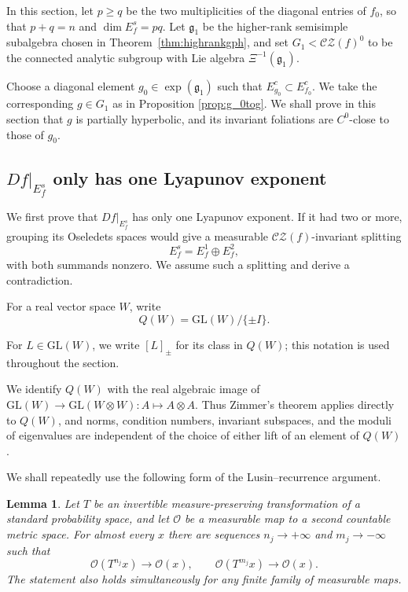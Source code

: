 \documentclass[11pt]{amsart}
\numberwithin{equation}{section}
\newcommand{\CZ}{\mathcal{CZ}}
\newcommand{\GL}{\mathrm{GL}}
\theoremstyle{plain}
\newtheorem{lem}[thm]{Lemma}
\begin{document}
In this section, let $p\ge q$ be the two multiplicities of the diagonal entries of $f_0$,
so that $p+q=n$ and $\dim E_f^s=pq$.  Let $\mathfrak g_1$ be the
higher-rank semisimple subalgebra chosen in
Theorem~\ref{thm:highrankgph}, and set
$
G_1<\CZ(f)^0$ to be the connected analytic subgroup with
Lie algebra $\Xi^{-1}(\mathfrak g_1).$

Choose a diagonal element $g_0\in\exp(\mathfrak g_1)$ such that $E^c_{g_0}\subset E^c_{f_0}$.  We take the corresponding $g\in G_1$ as in Proposition \ref{prop:g_0tog}. We shall prove in this section that $g$ is
partially hyperbolic, and its invariant foliations are $C^0$-close to those of
$g_0$.


\subsection{\texorpdfstring{$Df|_{E^s_f}$ only has one Lyapunov exponent}
{The stable derivative has only one Lyapunov exponent}}\label{sec:1exp}


We first prove that $Df|_{E_f^s}$ has only one Lyapunov exponent.  If it
had two or more, grouping its Oseledets spaces would give a measurable
$\CZ(f)$-invariant splitting
\[
E_f^s=E_f^1\oplus E_f^2,
\]
with both summands nonzero.  We assume such a splitting and derive a
contradiction.


For a real vector space $W$, write
\[
Q(W)=\GL(W)/\{\pm I\}.
\]

For $L\in\GL(W)$, we write $[L]_\pm$ for its class in $Q(W)$; this
notation is used throughout the section.

We identify $Q(W)$ with the real algebraic image of
$\GL(W)\to \GL(W\otimes W) :A\mapsto A\otimes A$.  Thus Zimmer's theorem applies directly to
$Q(W)$, and norms, condition numbers, invariant subspaces, and the
moduli of eigenvalues are independent of the choice of either lift of
an element of $Q(W)$.  

We shall repeatedly use the following form of the Lusin--recurrence
argument.

\begin{lem}\label{lem:observable-recurrence}
Let $T$ be an invertible measure-preserving transformation of a standard
probability space, and let $\mathcal O$ be a measurable map to a
second countable metric space.  For almost every $x$ there are sequences
$n_j\to+\infty$ and $m_j\to-\infty$ such that
\[
\mathcal O(T^{n_j}x)\longrightarrow\mathcal O(x),\qquad
\mathcal O(T^{m_j}x)\longrightarrow\mathcal O(x).
\]
The statement also holds simultaneously for any finite family of
measurable maps.
\end{lem}
\end{document}
